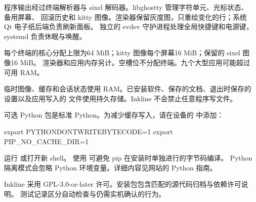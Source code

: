 程序输出经过终端解析器与 sixel 解码器。libghostty 管理字符单元、光标状态、备用屏幕、
回滚历史和 kitty 图像。渲染器保留灰度图，只重绘变化的行；系统 Qt 电子纸后端负责刷新面板。
独立的 evdev 守护进程处理全局快捷键和电源键，systemd 负责休眠与唤醒。

每个终端的核心分配上限为64 MiB；kitty 图像每个屏幕16 MiB；保留的 sixel 图像16 MiB。
渲染器和应用内存另计。空槽位不分配终端。九个大型应用可能超过可用 RAM。

临时图像、缓存和会话状态使用 RAM。已安装软件、保存的文档、退出时保存的设置以及应用写入的
文件使用持久存储。Inkline 不会禁止任意程序写文件。

可选 Python 包是标准 Python。为减少缓存写入，请在设备的  中添加：
\begin{shell}
export PYTHONDONTWRITEBYTECODE=1
export PIP_NO_CACHE_DIR=1
\end{shell}
运行  或打开新 shell。
使用  可避免 pip 在安装时单独进行的字节码编译。
Python 隔离模式会忽略 Python 环境变量。详细内容见网站的 Python 指南。

Inkline 采用 GPL-3.0-or-later 许可。安装包包含匹配的源代码归档与依赖许可说明。
测试记录区分自动检查与仍需实机确认的行为。
